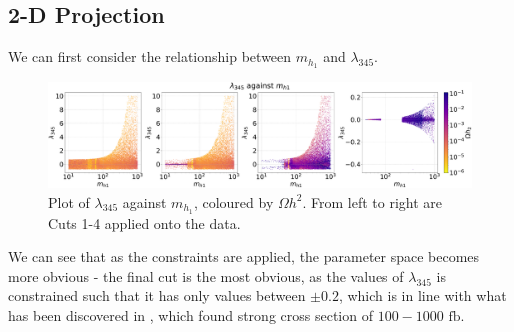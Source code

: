 \documentclass[12pt]{article}
\begin{document}
\subsection{2-D Projection}
\label{sec:2D-proj}
We can first consider the relationship between $m_{h_1}$ and $\lambda_{345}$. 
\begin{figure}[htb]
    \centering
    \includegraphics[width=\linewidth]{4plot/l345_MD1.pdf}
    \caption{Plot of $\lambda_{345}$ against $m_{h_1}$, coloured by $\Omega h^2$. From left to right are Cuts 1-4 applied onto the data.}
    \label{fig:enter-label}
\end{figure}

We can see that as the constraints are applied, the parameter space becomes more obvious - the final cut is the most obvious, as the values of $\lambda_{345}$ is constrained such that it has only values between $\pm 0.2$, which is in line with what has been discovered in \cite{Belyaev:2018ext}, which found strong cross section of $100 - 1000 \text{ fb}$. 
\end{document}
